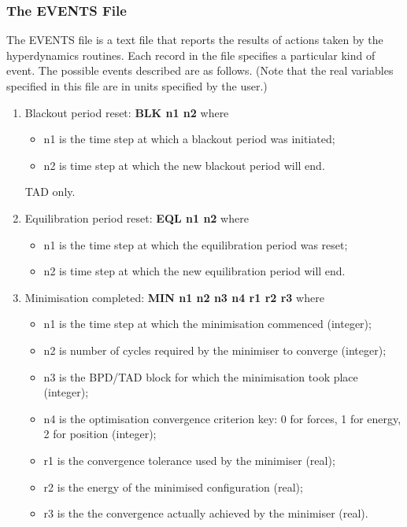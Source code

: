 \subsubsection{The EVENTS File}
\label{eventsfile}

The EVENTS file is a text file that reports the results of actions
taken by the hyperdynamics routines. Each record in the file specifies a
particular kind of event. The possible events described are as
follows. (Note that the real variables specified in this file are
in units specified by the user.)
\begin{enumerate}
\item Blackout period reset: {\bf BLK n1 n2} \newline
where 
\begin{itemize}
\item n1 is the time step at which a blackout period was initiated;
\item n2 is time step at which the new blackout period will end.
\end{itemize}
TAD only.
\item Equilibration period reset: {\bf EQL n1 n2} \newline
where 
\begin{itemize}
\item n1 is the time step at which the equilibration period was reset;
\item n2 is time step at which the new equilibration period will end.
\end{itemize}
\item Minimisation completed: {\bf MIN n1 n2 n3 n4 r1 r2 r3} \newline
where
\begin{itemize}
\item n1 is the time step at which the minimisation commenced (integer);
\item n2 is number of cycles required by the minimiser to converge (integer);
\item n3 is the BPD/TAD block for which the minimisation took place (integer);
\item n4 is the optimisation convergence criterion key: 0 for forces,
1 for energy, 2 for position (integer);
\item r1 is the convergence tolerance used by the minimiser (real);
\item r2 is the energy of the minimised configuration (real);
\item r3 is the the convergence actually achieved by the minimiser (real).

\end{itemize}
\end{enumerate}
